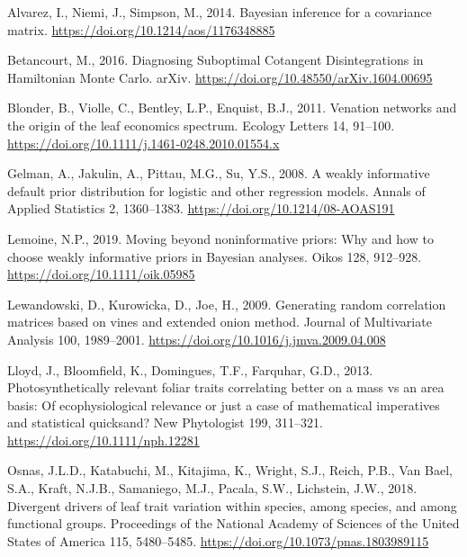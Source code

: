 \documentclass[
  12pt,
  letterpaper,
  DIV=11,
  numbers=noendperiod]{scrartcl}
\newlength{\cslhangindent}
\newlength{\cslentryspacingunit} %
\newenvironment{CSLReferences}[2] %
 {%
  \setlength{\parindent}{0pt}
  \ifodd #1
  \let\oldpar\par
  \def\par{\hangindent=\cslhangindent\oldpar}
  \fi
  \setlength{\parskip}{#2\cslentryspacingunit}
 }%
 {}
\begin{document}
\hypertarget{refs}{}
\begin{CSLReferences}{1}{0}
\leavevmode{}%
Alvarez, I., Niemi, J., Simpson, M., 2014. Bayesian inference for a
covariance matrix. \url{https://doi.org/10.1214/aos/1176348885}

\leavevmode{}%
Betancourt, M., 2016. Diagnosing {Suboptimal Cotangent Disintegrations}
in {Hamiltonian Monte Carlo}. arXiv.
\url{https://doi.org/10.48550/arXiv.1604.00695}

\leavevmode{}%
Blonder, B., Violle, C., Bentley, L.P., Enquist, B.J., 2011. Venation
networks and the origin of the leaf economics spectrum. Ecology Letters
14, 91--100. \url{https://doi.org/10.1111/j.1461-0248.2010.01554.x}

\leavevmode{}%
Gelman, A., Jakulin, A., Pittau, M.G., Su, Y.S., 2008. A weakly
informative default prior distribution for logistic and other regression
models. Annals of Applied Statistics 2, 1360--1383.
\url{https://doi.org/10.1214/08-AOAS191}

\leavevmode{}%
Lemoine, N.P., 2019. Moving beyond noninformative priors: Why and how to
choose weakly informative priors in {Bayesian} analyses. Oikos 128,
912--928. \url{https://doi.org/10.1111/oik.05985}

\leavevmode{}%
Lewandowski, D., Kurowicka, D., Joe, H., 2009. Generating random
correlation matrices based on vines and extended onion method. Journal
of Multivariate Analysis 100, 1989--2001.
\url{https://doi.org/10.1016/j.jmva.2009.04.008}

\leavevmode{}%
Lloyd, J., Bloomfield, K., Domingues, T.F., Farquhar, G.D., 2013.
Photosynthetically relevant foliar traits correlating better on a mass
vs an area basis: {Of} ecophysiological relevance or just a case of
mathematical imperatives and statistical quicksand? New Phytologist 199,
311--321. \url{https://doi.org/10.1111/nph.12281}

\leavevmode{}%
Osnas, J.L.D., Katabuchi, M., Kitajima, K., Wright, S.J., Reich, P.B.,
Van Bael, S.A., Kraft, N.J.B., Samaniego, M.J., Pacala, S.W., Lichstein,
J.W., 2018. Divergent drivers of leaf trait variation within species,
among species, and among functional groups. Proceedings of the National
Academy of Sciences of the United States of America 115, 5480--5485.
\url{https://doi.org/10.1073/pnas.1803989115}


\end{CSLReferences}
\end{document}
